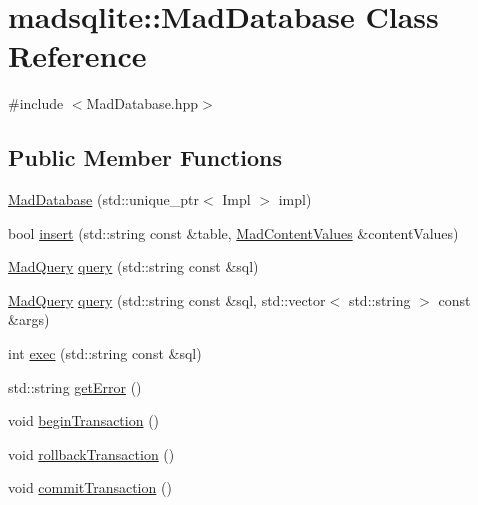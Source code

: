\hypertarget{classmadsqlite_1_1_mad_database}{}\section{madsqlite\+:\+:Mad\+Database Class Reference}
\label{classmadsqlite_1_1_mad_database}


{\ttfamily \#include $<$Mad\+Database.\+hpp$>$}

\subsection*{Public Member Functions}
\begin{DoxyCompactItemize}
\item 
\hyperlink{classmadsqlite_1_1_mad_database_a11eaaa62452515ae78f3879616862213}{Mad\+Database} (std\+::unique\+\_\+ptr$<$ Impl $>$ impl)
\item 
bool \hyperlink{classmadsqlite_1_1_mad_database_a29207a153e3a92eec7d718efd4c7b3a3}{insert} (std\+::string const \&table, \hyperlink{classmadsqlite_1_1_mad_content_values}{Mad\+Content\+Values} \&content\+Values)
\item 
\hyperlink{classmadsqlite_1_1_mad_query}{Mad\+Query} \hyperlink{classmadsqlite_1_1_mad_database_a6fb119ea383a9d93b7d3a5ddce7bc756}{query} (std\+::string const \&sql)
\item 
\hyperlink{classmadsqlite_1_1_mad_query}{Mad\+Query} \hyperlink{classmadsqlite_1_1_mad_database_a6514212d65ca428fb35ee87b9d3c78af}{query} (std\+::string const \&sql, std\+::vector$<$ std\+::string $>$ const \&args)
\item 
int \hyperlink{classmadsqlite_1_1_mad_database_adba4c69666317dcdf14cd3a1eb6260dd}{exec} (std\+::string const \&sql)
\item 
std\+::string \hyperlink{classmadsqlite_1_1_mad_database_ad70e43249370cd4a04183f3f98751b4e}{get\+Error} ()
\item 
void \hyperlink{classmadsqlite_1_1_mad_database_a985f7430489959d345b01ffc191a70d5}{begin\+Transaction} ()
\item 
void \hyperlink{classmadsqlite_1_1_mad_database_a3ebfd4349bde98e99dace3875c964861}{rollback\+Transaction} ()
\item 
void \hyperlink{classmadsqlite_1_1_mad_database_a438b3c7393a84de57b638db06d84bd7b}{commit\+Transaction} ()
\end{DoxyCompactItemize}
